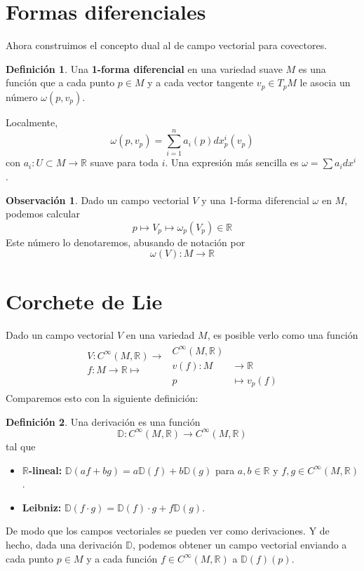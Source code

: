 \documentclass[spanish]{book}
\theoremstyle{definition}
\newtheorem*{defn}{Definición}
\newtheorem*{obs}{Observación}
\newcommand{\R}{\mathbb{R}}
\newcommand{\Cinf}{C^\infty}
\begin{document}
	\section{Formas diferenciales}\label{sec:formas-dif}
	Ahora construimos el concepto dual al de campo vectorial para covectores.
	\begin{defn}
		Una \textbf{1-forma diferencial} en una variedad suave $M$ es una función que a cada punto $p\in M$ y a cada vector tangente $v_p\in T_pM$ le asocia un número $\omega(p,v_p)$.
	\end{defn}
	Localmente,
	\[\omega(p,v_p)=\sum_{i=1}^na_i(p)dx^i_p(v_p)\]
	con $a_i:U\subset M\to\R$ suave para toda $i$. Una expresión más sencilla es $\omega=\sum a_idx^i$.
	\begin{obs}
		Dado un campo vectorial $V$ y una 1-forma diferencial $\omega$ en $M$, podemos calcular
		\[p\mapsto V_p\mapsto\omega_p(V_p)\in\R\]
		Este número lo denotaremos, abusando de notación por
		\[\omega(V):M\to\R\]
	\end{obs}
	
	\section{Corchete de Lie}
	Dado un campo vectorial $V$ en una variedad $M$, es posible verlo como una función
	\begin{align*}
		\begin{aligned}
			V:\Cinf(M,\R)\longrightarrow\\
			f:M\to\R\mapsto\\\\
		\end{aligned}
		\begin{aligned}
			\Cinf(M,\R)\\
			v(f):M&\to\R\\
			p&\mapsto v_p(f)
		\end{aligned}
	\end{align*}
	Comparemos esto con la siguiente definición:
	\begin{defn}
		Una derivación es una función
		\[\mathbb{D}:\Cinf(M,\R)\to\Cinf(M,\R)\]
		tal que
		\begin{itemize}
			\item \textbf{$\R$-lineal:} $\mathbb{D}(af+bg)=a\mathbb{D}(f)+b\mathbb{D}(g)$ para $a,b\in\R$ y $f,g\in\Cinf(M,\R)$.
			\item \textbf{Leibniz:} $\mathbb{D}(f\cdot g)=\mathbb{D}(f)\cdot g+f\mathbb{D}(g)$.
		\end{itemize}
	\end{defn}
	De modo que los campos vectoriales se pueden ver como derivaciones. Y de hecho, dada una derivación $\mathbb{D}$, podemos obtener un campo vectorial enviando a cada punto $p\in M$ y a cada función $f\in\Cinf(M,\R)$ a $\mathbb{D}(f)(p)$.
	
\end{document}
